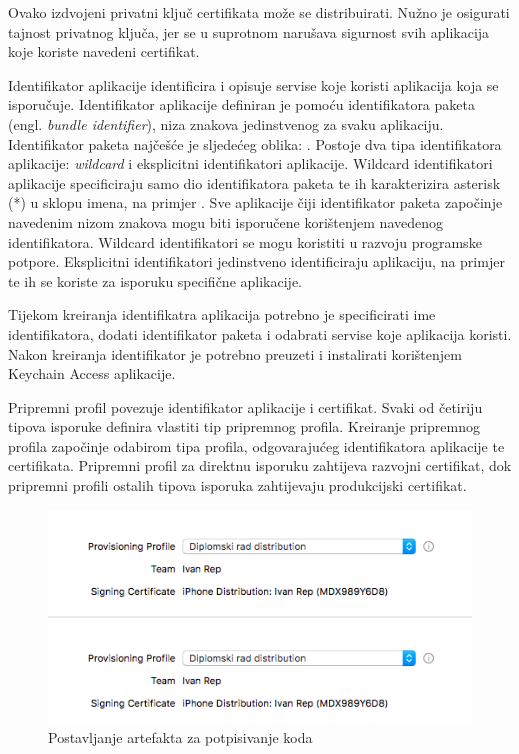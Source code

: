 \documentclass[times, utf8, diplomski, numeric]{fer}
\newcommand{\eng}[1]{(engl. \textit{#1})}
\begin{document}
Ovako izdvojeni privatni ključ certifikata može se distribuirati. Nužno je osigurati tajnost privatnog ključa, jer se u suprotnom narušava sigurnost svih aplikacija koje koriste navedeni certifikat.

Identifikator aplikacije identificira i opisuje servise koje koristi aplikacija koja se isporučuje. Identifikator aplikacije definiran je pomoću identifikatora paketa \eng{bundle identifier}, niza znakova jedinstvenog za svaku aplikaciju. Identifikator paketa najčešće je sljedećeg oblika: . Postoje dva tipa identifikatora aplikacije: \textit{wildcard} i eksplicitni identifikatori aplikacije. Wildcard identifikatori aplikacije specificiraju samo dio identifikatora paketa te ih karakterizira asterisk (*) u sklopu imena, na primjer . Sve aplikacije čiji identifikator paketa započinje navedenim nizom znakova mogu biti isporučene korištenjem navedenog identifikatora. Wildcard identifikatori se mogu koristiti u razvoju programske potpore. Eksplicitni identifikatori jedinstveno identificiraju aplikaciju, na primjer  te ih se koriste za isporuku specifične aplikacije.

Tijekom kreiranja identifikatra aplikacija potrebno je specificirati ime identifikatora, dodati identifikator paketa i odabrati servise koje aplikacija koristi. Nakon kreiranja identifikator je potrebno preuzeti i instalirati korištenjem Keychain Access aplikacije.

Pripremni profil povezuje identifikator aplikacije i certifikat. Svaki od četiriju tipova isporuke definira vlastiti tip pripremnog profila. Kreiranje pripremnog profila započinje odabirom tipa profila, odgovarajućeg identifikatora aplikacije te certifikata. Pripremni profil za direktnu isporuku zahtijeva razvojni certifikat, dok pripremni profili ostalih tipova isporuka zahtijevaju produkcijski certifikat.

\begin{figure}
\centering
\includegraphics[scale=0.6]{SigningArtefactsSetup}
\caption{Postavljanje artefakta za potpisivanje koda}
\label{fig:SigningArtefactsSetup}
\end{figure}
\end{document}
